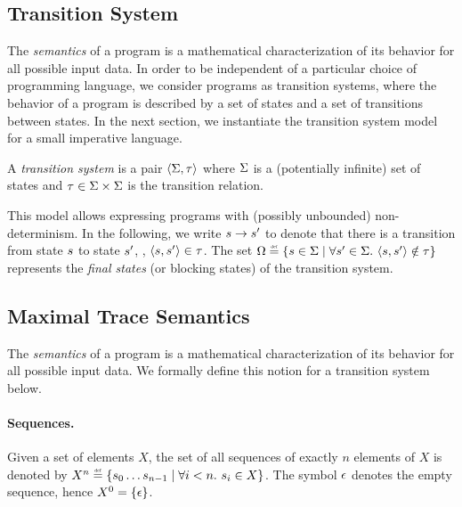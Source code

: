 \subsection{Transition System}

The \emph{semantics} of a program is a mathematical characterization of its behavior for all possible input data.
In order to be independent of a particular choice of programming language, we consider programs as transition systems, where the behavior of a program is described by a set of states and a set of transitions between states.
In the next section, we instantiate the transition system model for a small imperative language.

\begin{definition}
  A \emph{transition system} is a pair $\langle \Sigma, \tau \rangle$ where $\Sigma$ is a (potentially infinite) set of states and $\tau \in \Sigma\times\Sigma$ is the transition relation.
\end{definition}

This model allows expressing programs with (possibly unbounded) non-determinism.
In the following, we write $s \rightarrow s'$ to denote that there is a transition from state $s$ to state $s'$, \ie, $\langle s, s' \rangle \in \tau$.
The set $\finalstates \defeq \setdef{\defstate \in \state}{\forall \defstate' \in \state.\spacer \tuple{\defstate}{\defstate'} \notin \transitionrelation}$ represents the \emph{final states} (or blocking states) of the transition system.


\subsection{Maximal Trace Semantics}

The \emph{semantics} of a program is a mathematical characterization of its behavior for all possible input data. We formally define this notion for a transition system below.

\paragraph{Sequences.}
Given a set of elements $X$, the set of all sequences of exactly $n$ elements of $X$ is denoted by $X^n\defeq\setdef{\defstate_0 \dots \defstate_{n-1}}{\forall i < n.\spacer s_i \in X}$.
The symbol $\epsilon$ denotes the empty sequence, hence $X^0 = \{\epsilon\}$.

